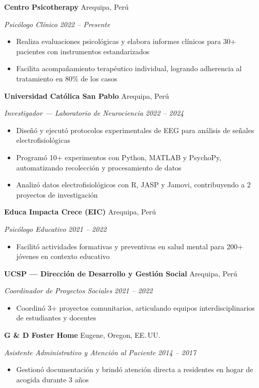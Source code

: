 \documentclass[11pt,letterpaper]{article}
\newcommand{\entry}[4]{%
  \noindent\textbf{#1} \hfill #2 \par\nopagebreak
  \textit{#3} \hfill \textit{#4} \par\nopagebreak
}
\begin{document}
\entry{Centro Psicotherapy}{Arequipa, Perú}{Psicólogo Clínico}{2022 -- Presente}
\begin{itemize}
  \item Realiza evaluaciones psicológicas y elabora informes clínicos para 30+ pacientes con instrumentos estandarizados
  \item Facilita acompañamiento terapéutico individual, logrando adherencia al tratamiento en 80\% de los casos
\end{itemize}
\vspace{0.2em}

\entry{Universidad Católica San Pablo}{Arequipa, Perú}{Investigador — Laboratorio de Neurociencia}{2022 -- 2024}
\begin{itemize}
  \item Diseñó y ejecutó protocolos experimentales de EEG para análisis de señales electrofisiológicas
  \item Programó 10+ experimentos con Python, MATLAB y PsychoPy, automatizando recolección y procesamiento de datos
  \item Analizó datos electrofisiológicos con R, JASP y Jamovi, contribuyendo a 2 proyectos de investigación
\end{itemize}
\vspace{0.2em}

\entry{Educa Impacta Crece (EIC)}{Arequipa, Perú}{Psicólogo Educativo}{2021 -- 2022}
\begin{itemize}
  \item Facilitó actividades formativas y preventivas en salud mental para 200+ jóvenes en contexto educativo
\end{itemize}
\vspace{0.2em}

\entry{UCSP — Dirección de Desarrollo y Gestión Social}{Arequipa, Perú}{Coordinador de Proyectos Sociales}{2021 -- 2022}
\begin{itemize}
  \item Coordinó 3+ proyectos comunitarios, articulando equipos interdisciplinarios de estudiantes y docentes
\end{itemize}
\vspace{0.2em}

\entry{G \& D Foster Home}{Eugene, Oregon, EE.\,UU.}{Asistente Administrativo y Atención al Paciente}{2014 -- 2017}
\begin{itemize}
  \item Gestionó documentación y brindó atención directa a residentes en hogar de acogida durante 3 años
\end{itemize}
\vspace{0.2em}
\end{document}
